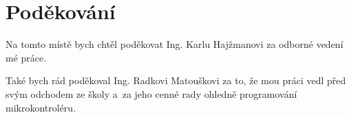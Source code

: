 \section*{Poděkování}
Na tomto místě bych chtěl poděkovat Ing. Karlu Hajžmanovi za odborné vedení
mé práce.

Také bych rád poděkoval Ing. Radkovi Matouškovi za to, že mou práci vedl před
svým odchodem ze školy a~za jeho cenné rady ohledně programování
mikrokontroléru.

